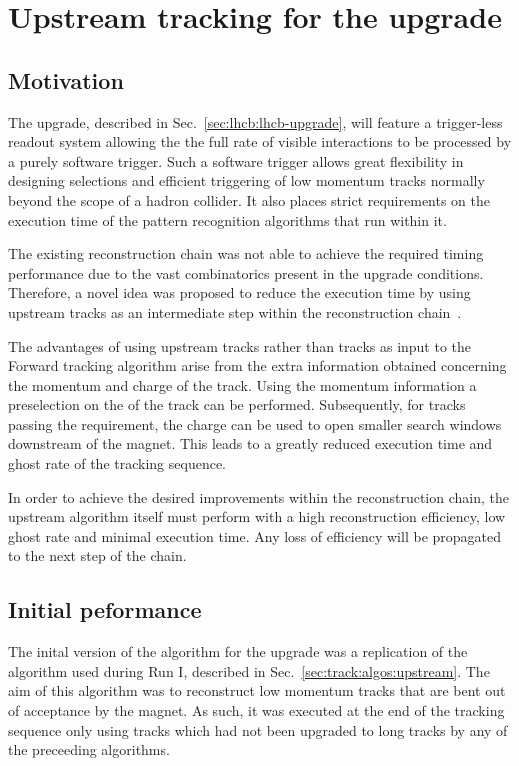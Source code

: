 \section{Upstream tracking for the \lhcb upgrade}
\label{sec:up-track-upgrade}

\subsection{Motivation}
\label{sec:up-track-upgrade:motivation}

The \lhcb upgrade, described in Sec.~\ref{sec:lhcb:lhcb-upgrade}, will feature a trigger-less readout system allowing the the full rate of visible interactions to be processed by a purely software trigger. Such a software trigger allows great flexibility in designing selections and efficient triggering of low momentum tracks normally beyond the scope of a hadron collider. It also places strict requirements on the execution time of the pattern recognition algorithms that run within it.

The existing reconstruction chain was not able to achieve the required timing performance due to the vast combinatorics present in the upgrade conditions. Therefore, a novel idea was proposed to reduce the execution time by using upstream tracks as an intermediate step within the reconstruction chain~\cite{velout}.

The advantages of using upstream tracks rather than \velo tracks as input to the Forward tracking algorithm arise from the extra information obtained concerning the momentum and charge of the track. Using the momentum information a preselection on the \pt of the track can be performed. Subsequently, for tracks passing the \pt requirement, the charge can be used to open smaller search windows downstream of the magnet. This leads to a greatly reduced execution time and ghost rate of the tracking sequence.

In order to achieve the desired improvements within the reconstruction chain, the upstream algorithm itself must perform with a high reconstruction efficiency, low ghost rate and minimal execution time. Any loss of efficiency will be propagated to the next step of the chain. 

\subsection{Initial peformance}

The inital version of the \velout algorithm for the \lhcb upgrade was a replication of the \velott algorithm used during Run I, described in Sec.~\ref{sec:track:algos:upstream}. The aim of this \velott algorithm was to reconstruct low momentum tracks that are bent out of acceptance by the magnet. As such, it was executed at the end of the tracking sequence only using \velo tracks which had not been upgraded to long tracks by any of the preceeding algorithms.

